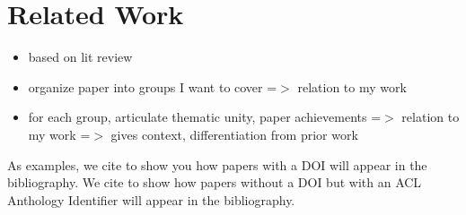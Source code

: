 \section{Related Work}

\begin{itemize}
  \item based on lit review
  \item organize paper into groups I want to cover =$>$ relation to my work
  \item for each group, articulate thematic unity, paper achievements =$>$ relation to my work =$>$ gives context, differentiation from prior work
\end{itemize}

As examples, we cite \citep{goodman-etal-2016-noise} to show you how papers with a DOI will appear in the bibliography.
We cite \citep{harper-2014-learning} to show how papers without a DOI but with an ACL Anthology Identifier will appear in the bibliography.